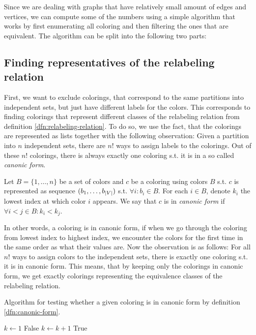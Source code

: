 Since we are dealing with graphs that have relatively small amount of edges and vertices, we can compute some of the numbers using a simple algorithm that works by first enumerating all coloring and then filtering the ones that are equivalent. The algorithm can be split into the following two parts:

\subsection{Finding representatives of the relabeling relation}

First, we want to exclude colorings, that correspond to the same partitions into independent sets, but just have different labels for the colors. This corresponds to finding colorings that represent different classes of the relabeling relation from definition \ref{dfn:relabeling-relation}. To do so, we use the fact, that the colorings are represented as lists together with the following observation: Given a partition into $n$ independent sets, there are $n!$ ways to assign labels to the colorings. Out of these $n!$ colorings, there is always exactly one coloring s.t. it is in a so called \textit{canonic form}.  

\begin{defn}\label{dfn:canonic-form}
    Let $B=\{1,\ldots,n\}$ be a set of colors and $c$ be a coloring using colors $B$ s.t. $c$ is represented as sequence $(b_1, \ldots,b_{\left|{V}\right|})$ s.t. $\forall i: b_i \in B$. For each $i \in B$, denote $k_i$ the lowest index at which color $i$ appears. We say that $c$ is in \emph{canonic form} if $\forall i < j \in B: k_i < k_j$.
\end{defn}

In other words, a coloring is in canonic form, if when we go through the coloring from lowest index to highest index, we encounter the colors for the first time in the same order as what their values are. Now the observation is as follows: For all $n!$ ways to assign colors to the independent sets, there is exactly one coloring s.t. it is in canonic form. This means, that by keeping only the colorings in canonic form, we get exactly colorings representing the equivalence classes of the relabeling relation.

\begin{algorithm}[H]
    \caption{Algorithm for testing whether a given coloring is in canonic form by definition \ref{dfn:canonic-form}.} 
    \begin{algorithmic}[1]
            \State $k \gets 1$      
                    \State \Return False
                \EndIf
                    \State $k \gets k + 1$
                \EndIf
            \EndFor   
            \State \Return True
        \EndFunction
    \end{algorithmic}
    \label{alg:is-in-canonic-form}
\end{algorithm}

